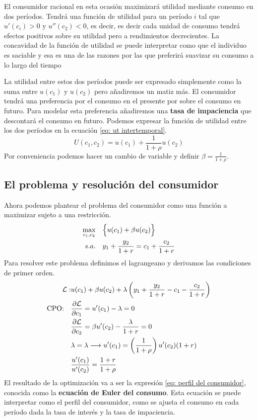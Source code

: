 El consumidor racional en esta ocasión maximizará utilidad mediante consumo en dos períodos. Tendrá una función de utilidad para un período $i$ tal que $u'(c_i)>0$ y $u''(c_2)<0$, es decir, es decir cada unidad de consumo tendrá efectos positivos sobre su utilidad pero a rendimientos decrecientes. La concavidad de la función de utilidad se puede interpretar como que el individuo es saciable y esa es una de las razones por las que preferirá suavizar su consumo a lo largo del tiempo

La utilidad entre estos dos períodos puede ser expresado simplemente como la suma entre $u(c_1)$ y $u(c_2)$ pero añadiremos un matiz más. El consumidor tendrá una preferencia por el consumo en el presente por sobre el consumo en futuro. Para modelar esta preferencia añadiremos una \textbf{tasa de impaciencia} que descontará el consumo en futuro. Podemos expresar la función de utilidad entre los dos períodos en la ecuación \ref{eq: ut intertemporal}.
\begin{equation}
    U(c_1,c_2) = u(c_1) + \frac{1}{1+\rho} u(c_2) \label{eq: ut intertemporal}
\end{equation}
Por conveniencia podemos hacer un cambio de variable y definir $\beta = \frac{1}{1+\rho}$. 

\subsection{El problema y resolución del consumidor}
Ahora podemos plantear el problema del consumidor como una función a maximizar sujeto a una restricción.
\begin{align*}
        \max_{c_1,c_2} & \quad \Bigl\{ u(c_1) + \beta u(c_2) \Bigr\} \\ s.a.& \quad  y_1 + \frac{y_2}{1+r} = c_1 + \frac{c_2}{1+r}
\end{align*}
Para resolver este problema definimos el lagrangeano y derivamos las condiciones de primer orden. 
\begin{align}
        \mathcal{L}:& u(c_1) + \beta u(c_2) + \lambda \left( y_1 + \frac{y_2}{1+r} - c_1 - \frac{c_2}{1+r} \right) \notag \\
        \text{CPO:} \quad & \frac{\partial \mathcal{L}}{\partial c_1} = u'(c_1) - \lambda = 0 \notag \\
        &\frac{\partial \mathcal{L}}{\partial c_2} = \beta u'(c_2) - \frac{\lambda}{1+r} = 0 \notag \\
        & \lambda = \lambda \longrightarrow u'(c_1) = \left( \frac{1}{1+\rho} \right) u'(c_2)(1+r) \notag \\
        &  \frac{u'(c_1)}{u'(c_2)} = \frac{1+r}{1+\rho} \label{eq: perfil del consumidor}
    \end{align}
El resultado de la optimización va a ser la expresión \ref{eq: perfil del consumidor}, conocida como la \textbf{ecuación de Euler del consumo}. Esta ecuación se puede interpretar como el perfil del consumidor, como se ajusta el consumo en cada período dada la tasa de interés y la tasa de impaciencia. 

